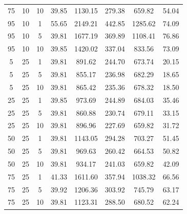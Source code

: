 \begin{table}[H]
\begin{tabular}{ccc|c|c|c|c|c}
75 & 10 & 10 & \cellcolor{gray!50}39.85 & \cellcolor{gray!1}1130.15 & \cellcolor{gray!1}279.38 & \cellcolor{gray!50}659.82 & 54.04\\
95 & 10 & 1 & \cellcolor{gray!1}55.65 & \cellcolor{gray!1}2149.21 & \cellcolor{gray!1}442.85 & \cellcolor{gray!1}1285.62 & 74.09\\
95 & 10 & 5 & \cellcolor{gray!50}39.81 & \cellcolor{gray!1}1677.19 & \cellcolor{gray!1}369.89 & \cellcolor{gray!1}1108.41 & 76.86\\
95 & 10 & 10 & \cellcolor{gray!50}39.85 & \cellcolor{gray!1}1420.02 & \cellcolor{gray!1}337.04 & \cellcolor{gray!1}833.56 & 73.09\\
5 & 25 & 1 & \cellcolor{gray!50}39.81 & \cellcolor{gray!23}891.62 & \cellcolor{gray!1}244.70 & \cellcolor{gray!46}673.74 & 20.15\\
5 & 25 & 5 & \cellcolor{gray!50}39.81 & \cellcolor{gray!29}855.17 & \cellcolor{gray!1}236.98 & \cellcolor{gray!44}682.29 & 18.65\\
5 & 25 & 10 & \cellcolor{gray!50}39.81 & \cellcolor{gray!27}865.42 & \cellcolor{gray!1}235.36 & \cellcolor{gray!45}678.32 & 18.50\\
25 & 25 & 1 & \cellcolor{gray!50}39.85 & \cellcolor{gray!9}973.69 & \cellcolor{gray!1}244.89 & \cellcolor{gray!43}684.03 & 35.46\\
25 & 25 & 5 & \cellcolor{gray!50}39.81 & \cellcolor{gray!28}860.88 & \cellcolor{gray!1}230.74 & \cellcolor{gray!45}679.11 & 33.15\\
25 & 25 & 10 & \cellcolor{gray!50}39.81 & \cellcolor{gray!22}896.96 & \cellcolor{gray!3}227.69 & \cellcolor{gray!50}659.82 & 31.72\\
50 & 25 & 1 & \cellcolor{gray!50}39.81 & \cellcolor{gray!1}1143.05 & \cellcolor{gray!1}294.28 & \cellcolor{gray!37}703.27 & 51.45\\
50 & 25 & 5 & \cellcolor{gray!50}39.81 & \cellcolor{gray!10}969.63 & \cellcolor{gray!1}260.42 & \cellcolor{gray!49}664.53 & 50.82\\
50 & 25 & 10 & \cellcolor{gray!50}39.81 & \cellcolor{gray!16}934.17 & \cellcolor{gray!1}241.03 & \cellcolor{gray!50}659.82 & 42.09\\
75 & 25 & 1 & \cellcolor{gray!35}41.33 & \cellcolor{gray!1}1611.60 & \cellcolor{gray!1}357.94 & \cellcolor{gray!1}1038.32 & 66.56\\
75 & 25 & 5 & \cellcolor{gray!49}39.92 & \cellcolor{gray!1}1206.36 & \cellcolor{gray!1}303.92 & \cellcolor{gray!24}745.79 & 63.17\\
75 & 25 & 10 & \cellcolor{gray!50}39.81 & \cellcolor{gray!1}1123.31 & \cellcolor{gray!1}288.50 & \cellcolor{gray!44}680.52 & 62.24\\

\end{tabular}
\end{table}
